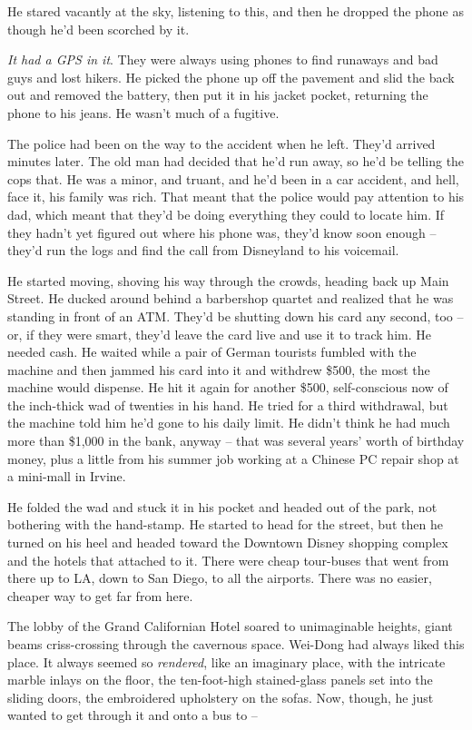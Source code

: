 He stared vacantly at the sky, listening to this, and then he
dropped the phone as though he'd been scorched by it.

\emph{It had a GPS in it}. They were always using phones to find
runaways and bad guys and lost hikers. He picked the phone up off
the pavement and slid the back out and removed the battery, then
put it in his jacket pocket, returning the phone to his jeans. He
wasn't much of a fugitive.

The police had been on the way to the accident when he left. They'd
arrived minutes later. The old man had decided that he'd run away,
so he'd be telling the cops that. He was a minor, and truant, and
he'd been in a car accident, and hell, face it, his family was
rich. That meant that the police would pay attention to his dad,
which meant that they'd be doing everything they could to locate
him. If they hadn't yet figured out where his phone was, they'd
know soon enough -- they'd run the logs and find the call from
Disneyland to his voicemail.

He started moving, shoving his way through the crowds, heading back
up Main Street. He ducked around behind a barbershop quartet and
realized that he was standing in front of an ATM. They'd be
shutting down his card any second, too -- or, if they were smart,
they'd leave the card live and use it to track him. He needed cash.
He waited while a pair of German tourists fumbled with the machine
and then jammed his card into it and withdrew \$500, the most the
machine would dispense. He hit it again for another \$500,
self-conscious now of the inch-thick wad of twenties in his hand.
He tried for a third withdrawal, but the machine told him he'd gone
to his daily limit. He didn't think he had much more than \$1,000
in the bank, anyway -- that was several years' worth of birthday
money, plus a little from his summer job working at a Chinese PC
repair shop at a mini-mall in Irvine.

He folded the wad and stuck it in his pocket and headed out of the
park, not bothering with the hand-stamp. He started to head for the
street, but then he turned on his heel and headed toward the
Downtown Disney shopping complex and the hotels that attached to
it. There were cheap tour-buses that went from there up to LA, down
to San Diego, to all the airports. There was no easier, cheaper way
to get far from here.

The lobby of the Grand Californian Hotel soared to unimaginable
heights, giant beams criss-crossing through the cavernous space.
Wei-Dong had always liked this place. It always seemed so
\emph{rendered}, like an imaginary place, with the intricate marble
inlays on the floor, the ten-foot-high stained-glass panels set
into the sliding doors, the embroidered upholstery on the sofas.
Now, though, he just wanted to get through it and onto a bus to --

